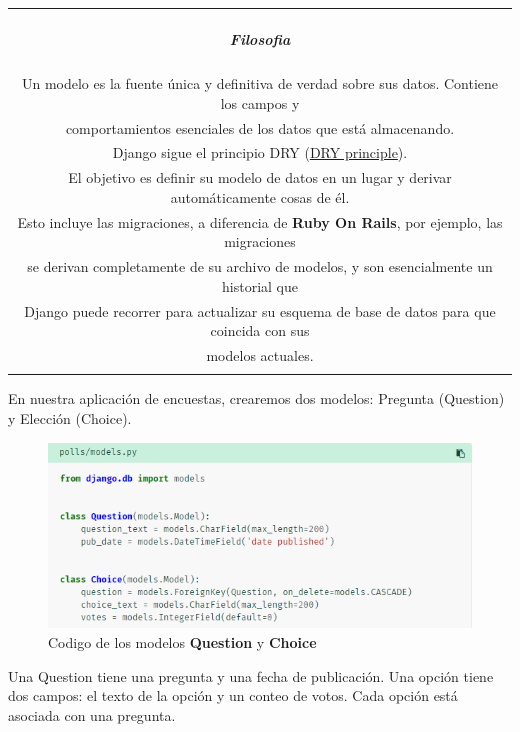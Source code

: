 \documentclass[10pt]{article}
\newcommand{\django}[1]{{\textcolor{G}{Django} #1}}
\begin{document}
\begin{table}[H]
	\begin{tabular}{||c||}
	\hline \\
	\begin{Large}
	\textbf{\textit{Filosofia}}
	\end{Large}
	\\\\		
Un modelo es la fuente única y definitiva de verdad sobre sus datos. Contiene los campos y \\comportamientos esenciales de los datos que está almacenando.\\ \django{} sigue el principio DRY ({\href{https://docs.djangoproject.com/en/3.0/misc/design-philosophies/\#dry}{\textcolor{B}{DRY principle}}}).\\ El objetivo es definir su modelo de datos en un lugar y derivar automáticamente cosas de él.\\

Esto incluye las migraciones, a diferencia de \textbf{Ruby On Rails}, por ejemplo, las migraciones\\ se derivan completamente de su archivo de modelos, y son esencialmente un historial que\\ \django{} puede recorrer para actualizar su esquema de base de datos para que coincida con sus\\ modelos actuales.
\\\\ \hline 	
			\end{tabular}
		\end{table}		

En nuestra aplicación de encuestas, crearemos dos modelos: Pregunta (Question) y Elección (Choice). 

\begin{figure}[H]
	\begin{center}
		\includegraphics[scale=0.7]{figuras/322/img1.png}
		\renewcommand{\arraystretch}{1.3}
		\caption{Codigo de los modelos \textbf{Question} y \textbf{Choice}}
	\end{center}
\end{figure}
Una Question tiene una pregunta y una fecha de publicación. Una opción tiene dos campos: el texto de la opción y un conteo de votos. Cada opción está asociada con una pregunta.
\end{document}
